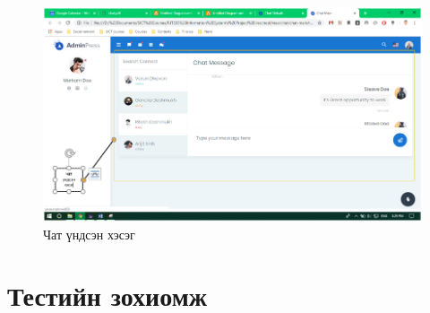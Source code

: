 \begin{figure}[htbp]
	\centering
	\includegraphics[scale=0.7]{Chart/Interface3}
	\caption[Хэрэглэгчийн интерфейс]{Чат үндсэн хэсэг}
	\label{fit:Interface}
\end{figure}
	
\section{Тестийн зохиомж}
	
